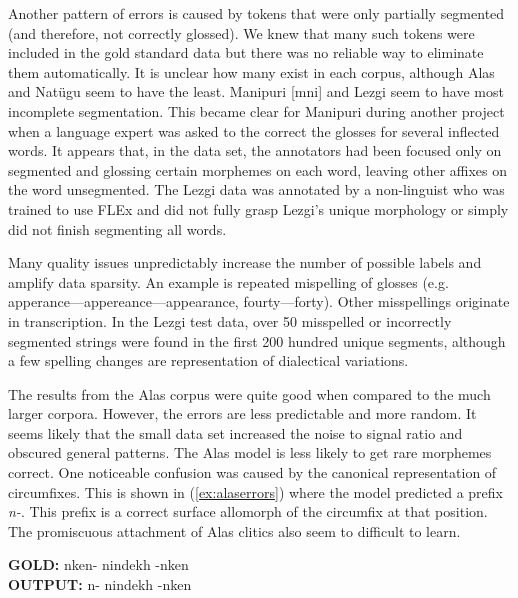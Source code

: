 Another pattern of errors is caused by tokens that were only partially segmented (and therefore, not correctly glossed). We knew that many such tokens were included in the gold standard data but there was no reliable way to eliminate them automatically. It is unclear how many exist in each corpus, although Alas and Nat\"ugu seem to have the least. Manipuri [mni] and Lezgi seem to have most incomplete segmentation. This became clear for Manipuri during another project when a language expert was asked to the correct the glosses for several inflected words. It appears that, in the data set, the annotators had been focused only on segmented and glossing certain morphemes on each word, leaving other affixes on the word unsegmented. 
The Lezgi data was annotated by a non-linguist who was trained to use FLEx and did not fully grasp Lezgi's unique morphology or simply did not finish segmenting all words. 

Many quality issues unpredictably increase the number of possible labels and amplify data sparsity. An example is
repeated mispelling of glosses (e.g. apperance---appereance---appearance, fourty---forty). Other misspellings originate in transcription. In the Lezgi test data, over 50 misspelled or incorrectly segmented strings were found in the first 200 hundred unique segments, although a few spelling changes are representation of dialectical variations.  


The results from the Alas corpus were quite good when compared to the much larger corpora. However, the errors are less predictable and more random. It seems likely that the small data set increased the noise to signal ratio and obscured general patterns. 
The Alas model is less likely to get rare morphemes correct. 
One noticeable confusion was caused by the canonical representation of circumfixes. This is shown in (\ref{ex:alaserrors}) where the model predicted a prefix \textit{n-}. This prefix is a correct surface allomorph of the circumfix at that position. 
The promiscuous attachment of Alas clitics also seem to difficult to learn.

\pex   
\label{ex:alaserrors}
\a \textbf{GOLD:} \hspace{2mm} n\textlangle{}\textrangle{}ken- \hspace{1mm} nindekh \hspace{1mm} -n\textlangle{}\textrangle{}ken \\
\textbf{OUTPUT:} \hspace{2mm} n- \hspace{5mm} nindekh \hspace{2mm} -n\textlangle{}\textrangle{}ken
\xe

